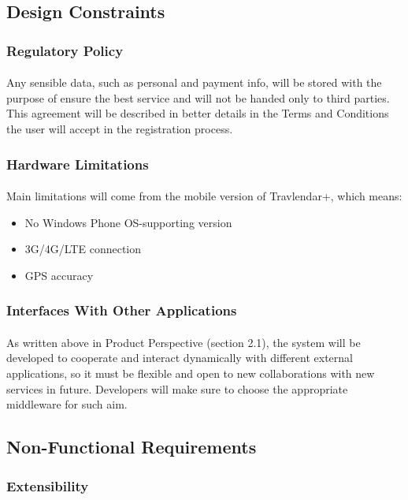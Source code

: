 \documentclass{article}
\begin{document}
\subsection{Design Constraints}
\subsubsection{Regulatory Policy}
\paragraph{}
Any sensible data, such as personal and payment info, will be stored with the purpose of ensure the best service and will not be handed only to third parties. This agreement will be described in better details in the Terms and Conditions the user will accept in the registration process.
\subsubsection{Hardware Limitations}
\paragraph{}
Main limitations will come from the mobile version of Travlendar+, which means:
\begin{itemize}
\item{} No Windows Phone OS-supporting version
\item{} 3G/4G/LTE connection
\item{} GPS accuracy
\end{itemize}
\subsubsection{Interfaces With Other Applications}
\paragraph{}
As written above in Product Perspective (section 2.1), the system will be developed to cooperate and interact dynamically with different external applications, so it must be flexible and open to new collaborations with new services in future. Developers will make sure to choose the appropriate middleware for such aim.
\newpage
\subsection{Non-Functional Requirements}
\subsubsection{Extensibility}
\end{document}

